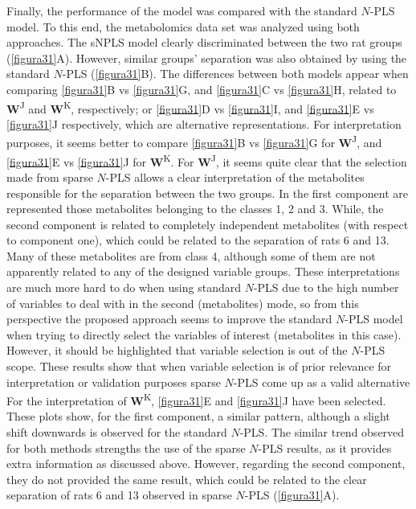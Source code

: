 Finally, the performance of the model was compared with the standard $N$-PLS model. To this end, the metabolomics data set was analyzed using both approaches. The sNPLS model clearly discriminated between the two rat groups (\autoref{figura31}A). However, similar groups’ separation was also obtained by using the standard $N$-PLS (\autoref{figura31}B). The differences between both models appear when comparing \autoref{figura31}B vs \autoref{figura31}G, and \autoref{figura31}C vs \autoref{figura31}H, related to \textbf{W}\textsuperscript{J} and \textbf{W}\textsuperscript{K}, respectively; or \autoref{figura31}D vs \autoref{figura31}I, and \autoref{figura31}E vs \autoref{figura31}J respectively, which are alternative representations. For interpretation purposes, it seems better to compare \autoref{figura31}B vs \autoref{figura31}G for \textbf{W}\textsuperscript{J}, and \autoref{figura31}E vs \autoref{figura31}J for \textbf{W}\textsuperscript{K}. For \textbf{W}\textsuperscript{J}, it seems quite clear that the selection made from sparse $N$-PLS allows a clear interpretation of the metabolites responsible for the separation between the two groups. In the first component are represented those metabolites belonging to the classes 1, 2 and 3. While, the second component is related to completely independent metabolites (with respect to component one), which could be related to the separation of rats 6 and 13. Many of these metabolites are from class 4, although some of them are not apparently related to any of the designed variable groups.
These interpretations are much more hard to do when using standard $N$-PLS due to the high number of variables to deal with in the second (metabolites) mode, so from this perspective the proposed approach seems to improve the standard $N$-PLS model when trying to directly select the variables of interest (metabolites in this case). However, it should be highlighted that variable selection is out of the $N$-PLS scope. These results show that when variable selection is of prior relevance for interpretation or validation purposes sparse $N$-PLS come up as a valid alternative
For the interpretation of \textbf{W}\textsuperscript{K}, \autoref{figura31}E and \autoref{figura31}J have been selected. These plots show,  for the first component, a similar pattern, although a slight shift downwards is observed for the standard $N$-PLS. The similar trend observed for both methods strengths the use of the sparse $N$-PLS results, as it provides extra information as discussed above. However, regarding the second component, they do not provided the same result, which could be related to the clear separation of rats 6 and 13 observed in sparse $N$-PLS (\autoref{figura31}A).

